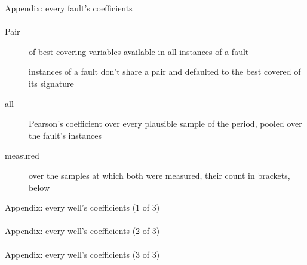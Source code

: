 \begin{frame}[label=pairs]{Appendix: every fault's coefficients}
  \framesubtitle{\dpquestion}
  \centering
  {%
    \scriptsize
    \setlength{\tabcolsep}{4pt}
    \def\arraystretch{1.5}
    
    \vskip 1mm
    \begin{description}
      \item [Pair] of best covering variables available in all instances of a fault
      \item [\dpsig{}] instances of a fault don't share a pair and defaulted to the best covered of its
        signature~\cite{vargas2026, vargas2019}
      \item [all] Pearson's coefficient over every plausible sample of the period, pooled over
        the fault's instances
      \item [measured] over the samples at which both were measured, their count in brackets,
         below \dpFew
    \end{description}
  }
\end{frame}

\begin{frame}{Appendix: every well's coefficients (1 of 3)}
  \framesubtitle{\dpquestion}
  \centering\scriptsize
  \setlength{\tabcolsep}{3pt}
  
\end{frame}

\begin{frame}{Appendix: every well's coefficients (2 of 3)}
  \framesubtitle{\dpquestion}
  \centering\scriptsize
  \def\arraystretch{1.1}
  \setlength{\tabcolsep}{3pt}
  
\end{frame}

\begin{frame}{Appendix: every well's coefficients (3 of 3)}
  \framesubtitle{\dpquestion}
  \centering\scriptsize
  \def\arraystretch{1.3}
  \setlength{\tabcolsep}{3pt}
  
\end{frame}


